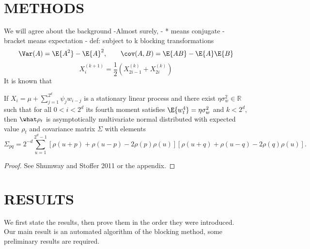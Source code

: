 \documentclass[11pt,english,a4paper]{article}
\begin{document}
\section*{\uppercase{Methods}}
We will agree about the background
-Almost surely,
- * means conjugate
- bracket means expectation
- def: subject to k blocking transformations
\begin{equation}
\Var(A) = \E{A^2} - \E{A}^2, \qquad \cov(A,B) = \E{AB} - \E{A}\E{B} \label{eq:varcov}
\end{equation}
\begin{equation}
X^{(k+1)}_{i} = \frac{1}{2} \left( X^{(k)}_{2i-1} + X^{(k)}_{2i} \right) \label{eq:block}
\end{equation}
It is known that 
\begin{theorem}
If $X_i = \mu + \sum_{j=1}^{2^d}\psi_jw_{i-j}$ is a stationary linear process and there exist $\eta \sigma^2_w \in \mathbb{R}$ such that for all $0<i<2^d$ its fourth moment satisfies $\E{w_t^4} = \eta \sigma^2_w$ and $k < 2^d$, then $\what \rho_t$ is asymptotically multivariate normal distributed with expected value $\rho_t$ and covariance matrix $\Sigma$ with elements
\[
\Sigma_{pq} = 2^{-d} \sum_{u=1}^{2^d-1} \left[ \rho(u + p) + \rho(u-p) - 2 \rho(p) \rho(u) \right]\left[ \rho(u+q) + \rho(u-q) - 2\rho(q)\rho(u) \right].
\]
\label{prop:rho}
\end{theorem}
\begin{proof}
See Shumway and Stoffer 2011 or the appendix.
\end{proof}

\section*{\uppercase{Results}}
We first state the results, then prove them in the order they were introduced. Our main result is an automated algorithm of the blocking method, some preliminary results are required. 
\end{document}
